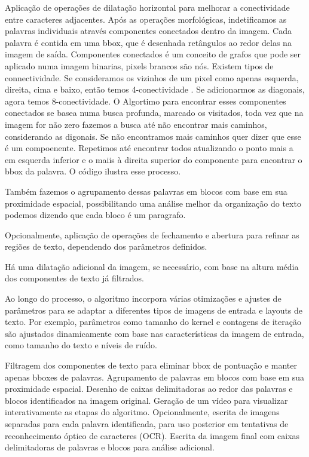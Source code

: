 \documentclass[english, 
               brazil, 
               bsc] %
               {dcomp-abntex2}
\begin{document}
Aplicação de operações de dilatação horizontal para melhorar a conectividade entre caracteres adjacentes.
Após as operações morfológicas, indetificamos as palavras individuais através componentes conectados dentro da imagem. Cada palavra é contida em uma bbox, que é desenhada retângulos ao redor delas na imagem de saída. Componentes conectados  é um conceito de grafos que pode ser aplicado numa imagem binarias, pixels brancos são nós. Existem tipos de connectividade. Se consideramos os vizinhos de um pixel como apenas esquerda, direita, cima e baixo, então temos 4-conectividade \cite[2.5.2 Adjacency, Connectivity, Regions, and Boundaries]{gonzalez2008digital}. Se adicionarmos as diagonais, agora temos 8-conectividade. O Algortimo para encontrar esses componentes conectados se basea numa busca profunda, marcado os visitados, toda vez que na imagem for não zero fazemos a busca até não encontrar mais caminhos, considerando as digonais. Se não encontramos mais caminhos quer dizer que esse é um compoenente. Repetimos até encontrar todos atualizando o ponto mais a em esquerda inferior e o maiis à direita superior do componente para encontrar o bbox da palavra. O código ilustra esse processo.


Também fazemos o agrupamento dessas palavras em blocos com base em sua proximidade espacial, possibilitando uma análise melhor da organização do texto podemos dizendo que cada bloco é um paragrafo.

Opcionalmente, aplicação de operações de fechamento e abertura para refinar as regiões de texto, dependendo dos parâmetros definidos.

Há uma dilatação adicional da imagem, se necessário, com base na altura média dos componentes de texto já filtrados.



Ao longo do processo, o algoritmo incorpora várias otimizações e ajustes de parâmetros para se adaptar a diferentes tipos de imagens de entrada e layouts de texto. Por exemplo, parâmetros como tamanho do kernel e contagens de iteração são ajustados dinamicamente com base nas características da imagem de entrada, como tamanho do texto e níveis de ruído.


Filtragem dos componentes de texto para eliminar bbox de pontuação e manter apenas bboxes de palavras.
Agrupamento de palavras em blocos com base em sua proximidade espacial.
Desenho de caixas delimitadoras ao redor das palavras e blocos identificados na imagem original.
Geração de um vídeo para visualizar interativamente as etapas do algoritmo.
Opcionalmente, escrita de imagens separadas para cada palavra identificada, para uso posterior em tentativas de reconhecimento óptico de caracteres (OCR).
Escrita da imagem final com caixas delimitadoras de palavras e blocos para análise adicional.
\end{document}
